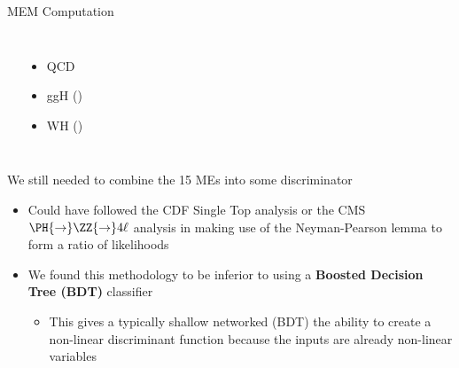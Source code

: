 \begin{frame}
\begin{block}{MEM Computation}
\begin{columns}[T]
\begin{itemize}
			\end{itemize}
			\begin{itemize}
				\item {\color{red}QCD}
				\item {\color{red}ggH (\gev)}
				\item {\color{red}WH (\gev)}
			\end{itemize}
		\end{columns}
	\end{block}
	\vspace*{-0.24cm}
	\begin{block}{We still needed to combine the 15 MEs into some discriminator}
	 	\begin{itemize}
	 		\item Could have followed the CDF Single Top analysis or the CMS $\PH{\rightarrow}\ZZ{\rightarrow}4\ell$ analysis in making use of the Neyman-Pearson lemma to form a ratio of likelihoods
	 		\item We found this methodology to be inferior to using a \textbf{Boosted Decision Tree (BDT)} classifier
	 		\begin{itemize}
	 			\item This gives a typically shallow networked (BDT) the ability to create a non-linear discriminant function because the inputs are already non-linear variables
	 		\end{itemize}
	 	\end{itemize}
	\end{block}
\end{frame}

